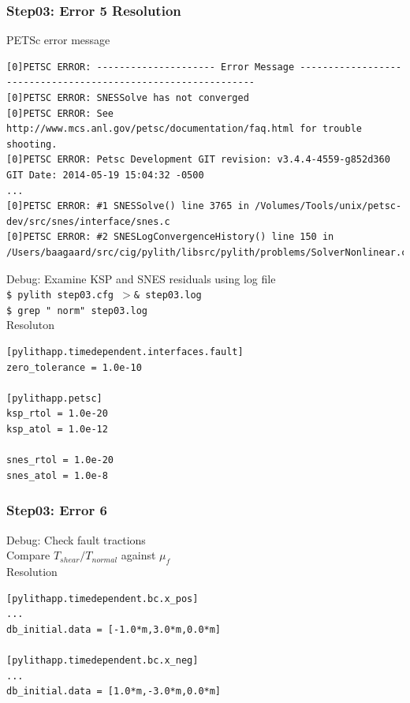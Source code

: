 \documentclass{beamer}
\newcommand{\cmd}[1]{{\tiny\tt \color{ltred}#1}}
\newcommand{\errlabel}[1]{{\small \color{blue}#1}}
\newcommand{\debuginfo}[1]{{\small \color{green}#1}}
\begin{document}
\begin{frame}[fragile]
  \frametitle{Step03: Error 5 Resolution}

\errlabel{PETSc error message}
\begin{lstlisting}
[0]PETSC ERROR: --------------------- Error Message --------------------------------------------------------------
[0]PETSC ERROR: SNESSolve has not converged
[0]PETSC ERROR: See http://www.mcs.anl.gov/petsc/documentation/faq.html for trouble shooting.
[0]PETSC ERROR: Petsc Development GIT revision: v3.4.4-4559-g852d360  GIT Date: 2014-05-19 15:04:32 -0500
...
[0]PETSC ERROR: #1 SNESSolve() line 3765 in /Volumes/Tools/unix/petsc-dev/src/snes/interface/snes.c
[0]PETSC ERROR: #2 SNESLogConvergenceHistory() line 150 in /Users/baagaard/src/cig/pylith/libsrc/pylith/problems/SolverNonlinear.cc
\end{lstlisting}\pause
\errlabel{Debug:} \debuginfo{Examine KSP and SNES residuals using log file}\\
\cmd{\$ pylith step03.cfg $>$\& step03.log}\\
\cmd{\$ grep " norm" step03.log}\pause\\
\errlabel{Resoluton}
\begin{lstlisting}
[pylithapp.timedependent.interfaces.fault]
zero_tolerance = 1.0e-10

[pylithapp.petsc]
ksp_rtol = 1.0e-20
ksp_atol = 1.0e-12

snes_rtol = 1.0e-20
snes_atol = 1.0e-8
\end{lstlisting}

\end{frame}


\begin{frame}[fragile]
  \frametitle{Step03: Error 6}

\errlabel{Debug:} \debuginfo{Check fault tractions}\pause\\
\debuginfo{Compare $T_\mathit{shear}/T_\mathit{normal}$ against $\mu_f$}\pause\\
\errlabel{Resolution}
\begin{lstlisting}
[pylithapp.timedependent.bc.x_pos]
...
db_initial.data = [-1.0*m,3.0*m,0.0*m]

[pylithapp.timedependent.bc.x_neg]
...
db_initial.data = [1.0*m,-3.0*m,0.0*m]
\end{lstlisting}

\end{frame}
\end{document}
